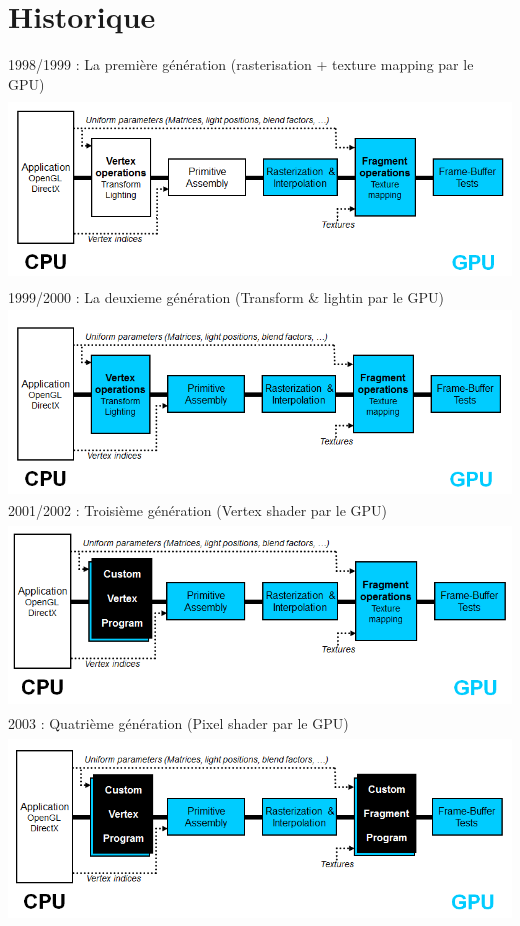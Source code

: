 \section{Historique}
1998/1999 : La première génération (rasterisation + texture mapping par le GPU)
\\
\includegraphics[width=14cm,height=50mm]{leo/images/pipeline1.png} 
1999/2000 : La deuxieme génération (Transform \& lightin par le GPU)
\\
\includegraphics[width=14cm,height=50mm]{leo/images/pipeline2.png} 
2001/2002 : Troisième génération (Vertex shader par le GPU)
\\
\includegraphics[width=14cm,height=50mm]{leo/images/pipeline3.png} 
2003 : Quatrième génération (Pixel shader par le GPU)
\\
\includegraphics[width=14cm,height=50mm]{leo/images/pipeline4.png} 


